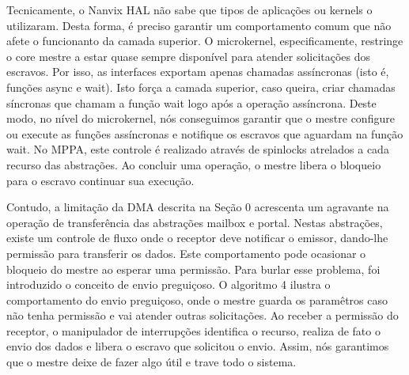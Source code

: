 			Tecnicamente, o Nanvix HAL não sabe que tipos de aplicações ou kernels o utilizaram.
			Desta forma, é preciso garantir um comportamento comum que não afete o funcionanto da camada superior.
			O microkernel, especificamente, restringe o core mestre a estar quase sempre disponível para atender solicitações dos escravos.
			Por isso, as interfaces exportam apenas chamadas assíncronas (isto é, funções async e wait).
			Isto força a camada superior, caso queira, criar chamadas síncronas que chamam a função wait logo após a operação assíncrona.
			Deste modo, no nível do microkernel, nós conseguimos garantir que o mestre configure ou execute as funções assíncronas e notifique os escravos que aguardam na função wait.
			No MPPA, este controle é realizado através de spinlocks atrelados a cada recurso das abstrações.
			Ao concluir uma operação, o mestre libera o bloqueio para o escravo continuar sua execução.

			Contudo, a limitação da DMA descrita na Seção 0 acrescenta um agravante na operação de transferência das abstrações mailbox e portal.
			Nestas abstrações, existe um controle de fluxo onde o receptor deve notificar o emissor, dando-lhe permissão para transferir os dados.
			Este comportamento pode ocasionar o bloqueio do mestre ao esperar uma permissão.
			Para burlar esse problema, foi introduzido o conceito de envio preguiçoso.
			O algoritmo 4 ilustra o comportamento do envio preguiçoso, onde o mestre guarda os paramêtros caso não tenha permissão e vai atender outras solicitações.
			Ao receber a permissão do receptor, o manipulador de interrupções identifica o recurso, realiza de fato o envio dos dados e libera o escravo que solicitou o envio.
			Assim, nós garantimos que o mestre deixe de fazer algo útil e trave todo o sistema.

